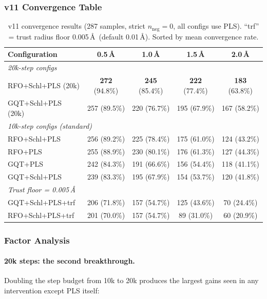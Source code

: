 \documentclass[11pt,a4paper]{article}
\theoremstyle{definition}
\begin{document}
\subsubsection{v11 Convergence Table}
\label{sec:v11-table}

\begin{table}[h]
\centering
\caption{v11 convergence results (287 samples, strict $n_\text{neg}=0$, all
  configs use PLS).  ``trf'' = trust radius floor 0.005\,\AA\ (default 0.01\,\AA).
  Sorted by mean convergence rate.}
\label{tab:v11}
\begin{tabular}{lcccc}
\toprule
Configuration & 0.5\,\AA & 1.0\,\AA & 1.5\,\AA & 2.0\,\AA \\
\midrule
\multicolumn{5}{l}{\emph{20k-step configs}} \\
RFO+Schl+PLS (20k) & \textbf{272} (94.8\%) & \textbf{245} (85.4\%) & \textbf{222} (77.4\%) & \textbf{183} (63.8\%) \\
GQT+Schl+PLS (20k) & 257 (89.5\%) & 220 (76.7\%) & 195 (67.9\%) & 167 (58.2\%) \\
\midrule
\multicolumn{5}{l}{\emph{10k-step configs (standard)}} \\
RFO+Schl+PLS        & 256 (89.2\%) & 225 (78.4\%) & 175 (61.0\%) & 124 (43.2\%) \\
RFO+PLS              & 255 (88.9\%) & 230 (80.1\%) & 176 (61.3\%) & 127 (44.3\%) \\
GQT+PLS              & 242 (84.3\%) & 191 (66.6\%) & 156 (54.4\%) & 118 (41.1\%) \\
GQT+Schl+PLS         & 239 (83.3\%) & 195 (67.9\%) & 154 (53.7\%) & 120 (41.8\%) \\
\midrule
\multicolumn{5}{l}{\emph{Trust floor = 0.005\,\AA}} \\
GQT+Schl+PLS+trf     & 206 (71.8\%) & 157 (54.7\%) & 125 (43.6\%) & 70 (24.4\%) \\
RFO+Schl+PLS+trf     & 201 (70.0\%) & 157 (54.7\%) & 89 (31.0\%) & 60 (20.9\%) \\
\bottomrule
\end{tabular}
\end{table}

\subsubsection{Factor Analysis}
\label{sec:v11-factors}

\paragraph{20k steps: the second breakthrough.}
Doubling the step budget from 10k to 20k produces the largest gains seen in
any intervention except PLS itself:
\end{document}
